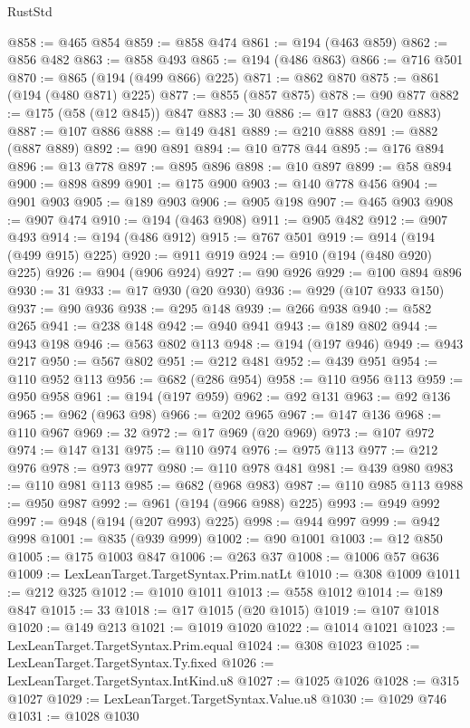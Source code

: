 \begin{lexlean}{RustStd}
\begin{coremodule}
@858 := @465 @854
@859 := @858 @474
@861 := @194 (@463 @859)
@862 := @856 @482
@863 := @858 @493
@865 := @194 (@486 @863)
@866 := @716 @501
@870 := @865 (@194 (@499 @866) @225)
@871 := @862 @870
@875 := @861 (@194 (@480 @871) @225)
@877 := @855 (@857 @875)
@878 := @90 @877
@882 := @175 (@58 (@12 @845)) @847
@883 := 30
@886 := @17 @883 (@20 @883)
@887 := @107 @886
@888 := @149 @481
@889 := @210 @888
@891 := @882 (@887 @889)
@892 := @90 @891
@894 := @10 @778 @44
@895 := @176 @894
@896 := @13 @778
@897 := @895 @896
@898 := @10 @897
@899 := @58 @894
@900 := @898 @899
@901 := @175 @900
@903 := @140 @778 @456
@904 := @901 @903
@905 := @189 @903
@906 := @905 @198
@907 := @465 @903
@908 := @907 @474
@910 := @194 (@463 @908)
@911 := @905 @482
@912 := @907 @493
@914 := @194 (@486 @912)
@915 := @767 @501
@919 := @914 (@194 (@499 @915) @225)
@920 := @911 @919
@924 := @910 (@194 (@480 @920) @225)
@926 := @904 (@906 @924)
@927 := @90 @926
@929 := @100 @894 @896
@930 := 31
@933 := @17 @930 (@20 @930)
@936 := @929 (@107 @933 @150)
@937 := @90 @936
@938 := @295 @148
@939 := @266 @938
@940 := @582 @265
@941 := @238 @148
@942 := @940 @941
@943 := @189 @802
@944 := @943 @198
@946 := @563 @802 @113
@948 := @194 (@197 @946)
@949 := @943 @217
@950 := @567 @802
@951 := @212 @481
@952 := @439 @951
@954 := @110 @952 @113
@956 := @682 (@286 @954)
@958 := @110 @956 @113
@959 := @950 @958
@961 := @194 (@197 @959)
@962 := @92 @131
@963 := @92 @136
@965 := @962 (@963 @98)
@966 := @202 @965
@967 := @147 @136
@968 := @110 @967
@969 := 32
@972 := @17 @969 (@20 @969)
@973 := @107 @972
@974 := @147 @131
@975 := @110 @974
@976 := @975 @113
@977 := @212 @976
@978 := @973 @977
@980 := @110 @978 @481
@981 := @439 @980
@983 := @110 @981 @113
@985 := @682 (@968 @983)
@987 := @110 @985 @113
@988 := @950 @987
@992 := @961 (@194 (@966 @988) @225)
@993 := @949 @992
@997 := @948 (@194 (@207 @993) @225)
@998 := @944 @997
@999 := @942 @998
@1001 := @835 (@939 @999)
@1002 := @90 @1001
@1003 := @12 @850
@1005 := @175 @1003 @847
@1006 := @263 @37
@1008 := @1006 @57 @636
@1009 := LexLeanTarget.TargetSyntax.Prim.natLt
@1010 := @308 @1009
@1011 := @212 @325
@1012 := @1010 @1011
@1013 := @558 @1012
@1014 := @189 @847
@1015 := 33
@1018 := @17 @1015 (@20 @1015)
@1019 := @107 @1018
@1020 := @149 @213
@1021 := @1019 @1020
@1022 := @1014 @1021
@1023 := LexLeanTarget.TargetSyntax.Prim.equal
@1024 := @308 @1023
@1025 := LexLeanTarget.TargetSyntax.Ty.fixed
@1026 := LexLeanTarget.TargetSyntax.IntKind.u8
@1027 := @1025 @1026
@1028 := @315 @1027
@1029 := LexLeanTarget.TargetSyntax.Value.u8
@1030 := @1029 @746
@1031 := @1028 @1030

\end{coremodule}
\end{lexlean}

